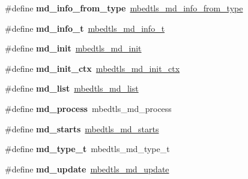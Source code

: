 \begin{DoxyCompactItemize}
\item 
\mbox{\label{compat-1_83_8h_aa785c74f31cd3e49d6cebd5890234de4}} 
\#define {\bfseries md\+\_\+info\+\_\+from\+\_\+type}~\mbox{\hyperlink{md_8h_aca53b51e0c8eb0e07c7eb4a3e6acfa0d}{mbedtls\+\_\+md\+\_\+info\+\_\+from\+\_\+type}}
\item 
\mbox{\label{compat-1_83_8h_ab9738ba1e54ac45d2277baeca2037fe7}} 
\#define {\bfseries md\+\_\+info\+\_\+t}~\mbox{\hyperlink{structmbedtls__md__info__t}{mbedtls\+\_\+md\+\_\+info\+\_\+t}}
\item 
\mbox{\label{compat-1_83_8h_a9f3fd266e052e304a588a5f0b86f5bf8}} 
\#define {\bfseries md\+\_\+init}~\mbox{\hyperlink{md_8h_ad8b02927ca10552e3cbf293fa8c10e24}{mbedtls\+\_\+md\+\_\+init}}
\item 
\mbox{\label{compat-1_83_8h_a54b6d26d991862bcc226493295d83caf}} 
\#define {\bfseries md\+\_\+init\+\_\+ctx}~\mbox{\hyperlink{md_8h_a40d6e9a8c2ee4d9c24782d4dd6fc7c36}{mbedtls\+\_\+md\+\_\+init\+\_\+ctx}}
\item 
\mbox{\label{compat-1_83_8h_aacbc1cecba17c269fed4d6697d55c073}} 
\#define {\bfseries md\+\_\+list}~\mbox{\hyperlink{md_8h_a51dc7cc39a5bf5b894cc1616bf798c06}{mbedtls\+\_\+md\+\_\+list}}
\item 
\mbox{\label{compat-1_83_8h_aa182d7399b8276cd0ba1bdef85277a4b}} 
\#define {\bfseries md\+\_\+process}~mbedtls\+\_\+md\+\_\+process
\item 
\mbox{\label{compat-1_83_8h_ae9bb3b39d35cf40c77c03d27152bf8dd}} 
\#define {\bfseries md\+\_\+starts}~\mbox{\hyperlink{md_8h_a24483eff556810e3489ac6abefa328e6}{mbedtls\+\_\+md\+\_\+starts}}
\item 
\mbox{\label{compat-1_83_8h_afa7a86119f85b1cefeb635f2fcc551fb}} 
\#define {\bfseries md\+\_\+type\+\_\+t}~mbedtls\+\_\+md\+\_\+type\+\_\+t
\item 
\mbox{\label{compat-1_83_8h_af4dca3fa01757d34badc7fea8c71e49e}} 
\#define {\bfseries md\+\_\+update}~\mbox{\hyperlink{md_8h_a7e50ce3a8c75b5221d07be657b93ca94}{mbedtls\+\_\+md\+\_\+update}}

\end{DoxyCompactItemize}
